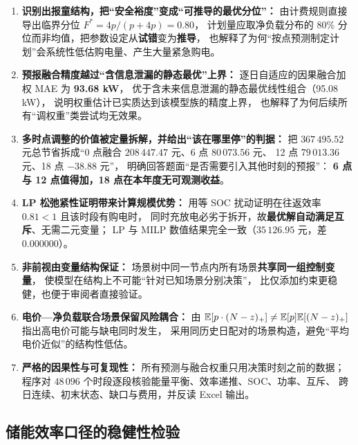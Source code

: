 \begin{enumerate}[itemsep=3pt,topsep=3pt]
  \item \textbf{识别出报童结构，把“安全裕度”变成“可推导的最优分位”：}
        由计费规则直接导出临界分位 $F^*=4p/(p+4p)=0.80$，
        计划量应取净负载分布的 80\% 分位而非均值，把参数设定从\textbf{试错}变为\textbf{推导}，
        也解释了为何“按点预测制定计划”会系统性低估购电量、产生大量紧急购电。

  \item \textbf{预报融合精度越过“含信息泄漏的静态最优”上界：}
        逐日自适应的因果融合加权 MAE 为 \textbf{93.68 kW}，
        优于含未来信息泄漏的静态最优线性组合（95.08 kW），
        说明权重估计已实质达到该模型族的精度上界，
        也解释了为何后续所有“调权重”类尝试均无效果。

  \item \textbf{多时点调整的价值被定量拆解，并给出“该在哪里停”的判据：}
        把 $367\,495.52$ 元总节省拆成“0 点融合 $208\,447.47$ 元、6 点 $80\,073.56$ 元、
        12 点 $79\,013.36$ 元、18 点 $-38.88$ 元”，
        明确回答题面“是否需要引入其他时刻的预报”：
        \textbf{6 点与 12 点值得加，18 点在本年度无可观测收益}。

  \item \textbf{LP 松弛紧性证明带来计算规模优势：}
        用等 SOC 扰动证明在往返效率 $0.81<1$ 且该时段有购电时，
        同时充放电必劣于拆开，故\textbf{最优解自动满足互斥}、无需二元变量；
        LP 与 MILP 数值结果完全一致（$35\,126.95$ 元，差 $0.000000$）。

  \item \textbf{非前视由变量结构保证：}
        场景树中同一节点内所有场景\textbf{共享同一组控制变量}，
        使模型在结构上不可能“针对已知场景分别决策”，
        比仅添加约束更稳健，也便于审阅者直接验证。

  \item \textbf{电价—净负载联合场景保留风险耦合：}
        由 $\mathbb{E}[p\cdot(N-z)_+]\neq\mathbb{E}[p]\mathbb{E}[(N-z)_+]$ 指出高电价可能与缺电同时发生，
        采用同历史日配对的场景构造，避免“平均电价近似”的结构性低估。

  \item \textbf{严格的因果性与可复现性：}
        所有预测与融合权重只用决策时刻之前的数据；
        程序对 $48\,096$ 个时段逐段核验能量平衡、效率递推、SOC、功率、互斥、
        跨日连续、初末状态、缺口与费用，并反读 Excel 输出。
\end{enumerate}

\subsection{储能效率口径的稳健性检验}
\label{sec:eff-robust}

